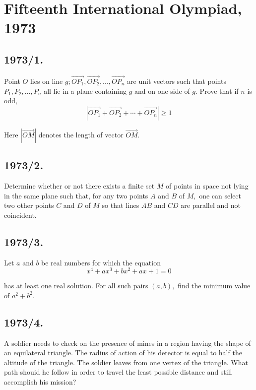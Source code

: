 \documentclass[12pt,thmsa]{article}
\begin{document}
\section{Fifteenth International Olympiad, 1973}

\subsection{1973/1.}

Point $O$ lies on line $g;\overrightarrow{OP_{1}},\overrightarrow{OP_{2}}%
,...,\overrightarrow{OP_{n}}$ are unit vectors such that points $%
P_{1},P_{2},...,P_{n}$ all lie in a plane containing $g$ and on one side of $%
g.$ Prove that if $n$ is odd,
\[
\left| \overrightarrow{OP_{1}}+\overrightarrow{OP_{2}}+\cdots +%
\overrightarrow{OP_{n}}\right| \geq 1
\]

Here $\left| \overrightarrow{OM}\right| $ denotes the length of vector $%
\overrightarrow{OM}$.

\subsection{1973/2.}

Determine whether or not there exists a finite set $M$ of points in space
not lying in the same plane such that, for any two points $A$ and $B$ of $M,$
one can select two other points $C$ and $D$ of $M$ so that lines $AB$ and $CD
$ are parallel and not coincident.

\subsection{1973/3.}

Let $a$ and $b$ be real numbers for which the equation
\[
x^{4}+ax^{3}+bx^{2}+ax+1=0
\]

has at least one real solution. For all such pairs $(a,b),$ find the minimum
value of $a^{2}+b^{2}.$

\subsection{1973/4. }

A soldier needs to check on the presence of mines in a region having the
shape of an equilateral triangle. The radius of action of his detector is
equal to half the altitude of the triangle. The soldier leaves from one
vertex of the triangle. What path shouid he follow in order to travel the
least possible distance and still accomplish his mission?
\end{document}
